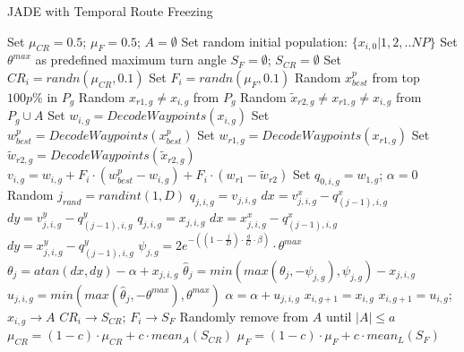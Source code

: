 \documentclass[10pt,a4paper, oneside, conference]{IEEEtran}
\begin{document}
	
	\begin{algorithm}[h]
  \caption{JADE with Temporal Route Freezing}\label{algorithm:JADEwFreezing}
  \begin{algorithmic}[1]
    \State Set $\mu_{CR}=0.5$; $\mu_{F}=0.5$; $A=\emptyset$
    \State Set random initial population: $ \{x_{i,0}|1,2,..NP \}$
    \State Set $\theta^{max}$ as predefined maximum turn angle
    \State $S_F=\emptyset$; $S_{CR}=\emptyset$
    \State Set $CR_i=randn(\mu_{CR},0.1)$
    \State Set $F_i=randn(\mu_{F},0.1)$
    \State Random $x_{best}^p$ from top $100p\%$ in $P_g$
    \State Random $x_{r1,g} \neq x_{i,g}$ from $P_g$
    \State Random $\widetilde{x}_{r2,g} \neq x_{r1,g} \neq x_{i,g}$ from $P_g \cup A$
    \State Set $w_{i,g}=DecodeWaypoints(x_{i,g})$
    \State Set $w_{best}^p=DecodeWaypoints(x_{best}^p)$
    \State Set $w_{r1,g}=DecodeWaypoints(x_{r1,g})$
    \State Set $\widetilde{w}_{r2,g}=DecodeWaypoints(\widetilde{x}_{r2,g})$
	\State $v_{i,g}=w_{i,g} + F_i \cdot (w^p_{best}-w_{i,g})+ F_i \cdot (w_{r1}-\widetilde{w}_{r2})$
	\State Set $q_{0,i,g}=w_{1,g}$; $\alpha=0$
	\State Random $j_{rand}=randint(1,D)$
	\State $q_{j,i,g} = v_{j,i,g}$
	\State $dx= v^x_{j,i,g}-q^x_{(j-1),i,g}$
	\State $dy= v^y_{j,i,g}-q^y_{(j-1),i,g}$
	\Else
	\State $q_{j,i,g} = x_{j,i,g}$
	\State $dx= x^x_{j,i,g}-q^x_{(j-1),i,g}$
	\State $dy= x^y_{j,i,g}-q^y_{(j-1),i,g}$
	\EndIf
	\State $\psi_{j,g} = 2e^{-((1-\frac{j}{D}) \cdot \frac{g}{G} \cdot \beta)} \cdot \theta^{max}$
	\State $\theta_j = atan(dx,dy) - \alpha + x_{j,i,g}$
	\State $\widehat{\theta}_j = min(max(\theta_j,-\psi_{j,g}),\psi_{j,g})-x_{j,i,g}$
	\State $u_{j,i,g}=min(max(\widehat{\theta}_j,-\theta^{max}),\theta^{max})$
	\State $\alpha = \alpha + u_{j,i,g}$
	\EndFor
	\State $x_{i,g+1}=x_{i,g}$
	\Else
	\State $x_{i,g+1}=u_{i,g}$; $x_{i,g} \rightarrow A$
	\State $CR_i \rightarrow S_{CR}$; $F_i \rightarrow S_F$
	\EndIf
    \EndFor
    \State Randomly remove from $A$ until $|A| \leq a$
    \State $\mu_{CR}=(1-c) \cdot \mu_{CR} + c \cdot mean_A(S_{CR})$
    \State $\mu_F=(1-c) \cdot \mu_F + c \cdot mean_L(S_F)$
    \EndFor
    \EndProcedure
  \end{algorithmic}
\end{algorithm}
%	
%	
%	
%	
%	
%	
%	
	
\end{document}

